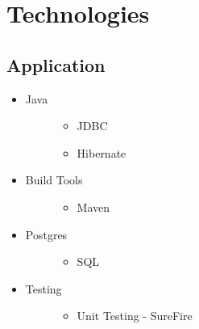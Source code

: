 \documentclass[letterpaper,10pt,english]{sphinxmanual}
\begin{document}
\section{Technologies}
\label{\detokenize{Technologies:technologies}}\label{\detokenize{Technologies::doc}}

\subsection{Application}
\label{\detokenize{Technologies:application}}\begin{itemize}
\item {} \begin{description}
\item[{Java}] \leavevmode\begin{itemize}
\item {} 
JDBC

\item {} 
Hibernate

\end{itemize}

\end{description}

\item {} \begin{description}
\item[{Build Tools}] \leavevmode\begin{itemize}
\item {} 
Maven

\end{itemize}

\end{description}

\item {} \begin{description}
\item[{Postgres}] \leavevmode\begin{itemize}
\item {} 
SQL

\end{itemize}

\end{description}

\item {} \begin{description}
\item[{Testing}] \leavevmode\begin{itemize}
\item {} 
Unit Testing - SureFire


\end{itemize}
\end{description}
\end{itemize}
\end{document}
